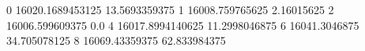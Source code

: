 0 16020.1689453125 13.5693359375
1 16008.759765625 2.16015625
2 16006.599609375 0.0
4 16017.8994140625 11.2998046875
6 16041.3046875 34.705078125
8 16069.43359375 62.833984375

